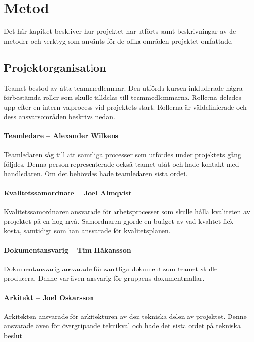 \chapter{Metod}
\label{cha:method}
Det här kapitlet beskriver hur projektet har utförts samt beskrivningar av de metoder och verktyg som använts för de olika områden projektet omfattade.

\section{Projektorganisation}
Teamet bestod av åtta teammedlemmar. Den utförda kursen inkluderade några förbestämda roller som skulle tilldelas till teammedlemmarna. Rollerna delades upp efter en intern valprocess vid projektets start. Rollerna är väldefinierade och dess ansvarsområden beskrivs nedan.

\subsubsection*{Teamledare -- Alexander Wilkens}
Teamledaren såg till att samtliga processer som utfördes under projektets gång följdes. Denna person representerade också teamet utåt och hade kontakt med handledaren. Om det behövdes hade teamledaren sista ordet.

\subsubsection*{Kvalitetssamordnare -- Joel Almqvist}
Kvalitetssamordnaren ansvarade för arbetsprocesser som skulle hålla kvaliteten av projektet på en hög nivå. Samordnaren gjorde en budget av vad kvalitet fick kosta, samtidigt som han ansvarade för kvalitetsplanen.

\subsubsection*{Dokumentansvarig -- Tim Håkansson}
Dokumentansvarig ansvarade för samtliga dokument som teamet skulle producera. Denne var även ansvarig för gruppens dokumentmallar.

\subsubsection*{Arkitekt -- Joel Oskarsson}
Arkitekten ansvarade för arkitekturen av den tekniska delen av projektet. Denne ansvarade även för övergripande teknikval och hade det sista ordet på tekniska beslut.

